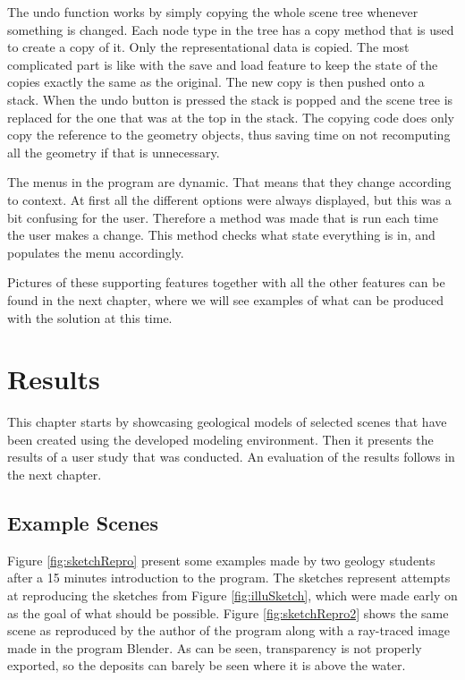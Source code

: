 \documentclass[a4paper,12pt]{report}
\begin{document}
The undo function works by simply copying the whole scene tree whenever something is changed. Each node type in the tree has a copy method that is used to create a copy of it. Only the representational data is copied. The most complicated part is like with the save and load feature to keep the state of the copies exactly the same as the original. The new copy is then pushed onto a stack. When the undo button is pressed the stack is popped and the scene tree is replaced for the one that was at the top in the stack. The copying code does only copy the reference to the geometry objects, thus saving time on not recomputing all the geometry if that is unnecessary.

The menus in the program are dynamic. That means that they change according to context. At first all the different options were always displayed, but this was a bit confusing for the user. Therefore a method was made that is run each time the user makes a change. This method checks what state everything is in, and populates the menu accordingly.

Pictures of these supporting features together with all the other features can be found in the next chapter, where we will see examples of what can be produced with the solution at this time.

\clearpage
\chapter{Results}
This chapter starts by showcasing geological models of selected scenes that have been created using the developed modeling environment. Then it presents the results of a user study that was conducted. An evaluation of the results follows in the next chapter. 
\label{sec:results}

\section{Example Scenes}
Figure \ref{fig:sketchRepro} present some examples made by two geology students after a 15 minutes introduction to the program. The sketches represent attempts at reproducing the sketches from Figure \ref{fig:illuSketch}, which were made early on as the goal of what should be possible. Figure \ref{fig:sketchRepro2} shows the same scene as reproduced by the author of the program along with a ray-traced image made in the program Blender. As can be seen, transparency is not properly exported, so the deposits can barely be seen where it is above the water.
\end{document}
